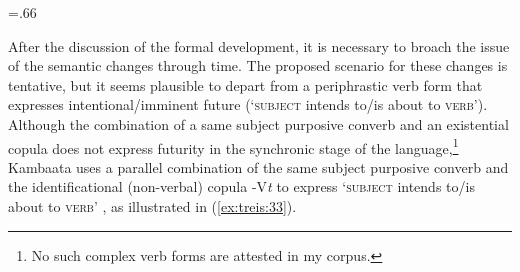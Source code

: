 \documentclass[output=paper,colorlinks,citecolor=brown,
]{langsci/langscibook}
\begin{document}
\begin{table}
\small%
\tabcolsep=.66\tabcolsep%
    \caption{The origin of the progressive}
    \label{tab:treis:7}
\end{table}

After the discussion of the formal development, it is necessary to broach the issue of the semantic changes through time. The proposed scenario for these changes is tentative, but it seems plausible to depart from a periphrastic verb form that expresses intentional\slash imminent future (`\textsc{subject} intends to\slash is about to \textsc{verb}'). Although the combination of a same subject purposive converb and an existential copula does not express futurity in the synchronic stage of the language,\footnote{No such complex verb forms are attested in my corpus.} Kambaata uses a parallel combination of the same subject purposive converb and the identificational (non-verbal) copula -V\textit{t} to express `\textsc{subject} intends to\slash is about to \textsc{verb}' \citep[139--141]{Treis2011}, as illustrated in (\ref{ex:treis:33}).
\end{document}
